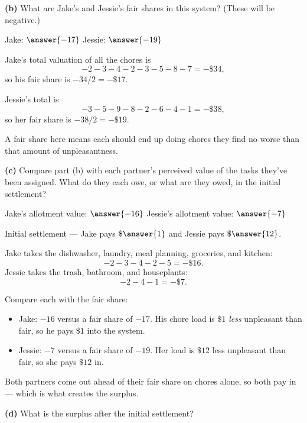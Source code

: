 \documentclass[12pt]{ximera}
\begin{document}
\begin{problem}
\begin{prompt}
\textbf{(b)} What are Jake's and Jessie's fair shares in this system? (These will be
negative.)

Jake: $\answer{-17}$ \qquad Jessie: $\answer{-19}$

\begin{feedback}
Jake's total valuation of all the chores is
\[ -2-3-4-2-3-5-8-7 = -\$34, \]
so his fair share is $-34/2 = -\$17$.

Jessie's total is
\[ -3-5-9-8-2-6-4-1 = -\$38, \]
so her fair share is $-38/2 = -\$19$.

A fair share here means each should end up doing chores they find no worse than that
amount of unpleasantness.
\end{feedback}
\end{prompt}

\begin{prompt}
\textbf{(c)} Compare part (b) with each partner's perceived value of the tasks they've
been assigned. What do they each owe, or what are they owed, in the initial settlement?

Jake's allotment value: $\answer{-16}$ \qquad Jessie's allotment value: $\answer{-7}$

\smallskip
Initial settlement --- Jake pays $\$\answer{1}$ and Jessie pays $\$\answer{12}$.

\begin{feedback}
Jake takes the dishwasher, laundry, meal planning, groceries, and kitchen:
\[ -2-3-4-2-5 = -\$16. \]
Jessie takes the trash, bathroom, and houseplants:
\[ -2-4-1 = -\$7. \]

Compare each with the fair share:
\begin{itemize}
\item Jake: $-16$ versus a fair share of $-17$. His chore load is $\$1$ \emph{less}
      unpleasant than fair, so he pays $\$1$ into the system.
\item Jessie: $-7$ versus a fair share of $-19$. Her load is $\$12$ less unpleasant
      than fair, so she pays $\$12$ in.
\end{itemize}
Both partners come out ahead of their fair share on chores alone, so both pay in ---
which is what creates the surplus.
\end{feedback}
\end{prompt}

\begin{prompt}
\textbf{(d)} What is the surplus after the initial settlement?


\end{prompt}
\end{problem}
\end{document}
